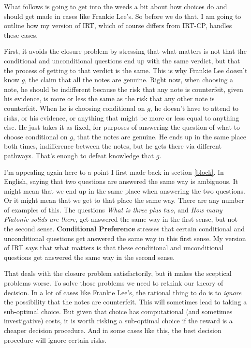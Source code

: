 \documentclass[11pt,]{book}
\begin{document}
What follows is going to get into the weeds a bit about how choices do and should get made in cases like Frankie Lee's. So before we do that, I am going to outline how my version of IRT, which of course differs from IRT-CP, handles these cases.

First, it avoids the closure problem by stressing that what matters is not that the conditional and unconditional questions end up with the same verdict, but that the process of getting to that verdict is the same. This is why Frankie Lee doesn't know \(g\), the claim that all the notes are genuine. Right now, when choosing a note, he should be indifferent because the risk that any note is counterfeit, given his evidence, is more or less the same as the risk that any other note is counterfeit. When he is choosing conditional on \(g\), he doesn't have to attend to risks, or his evidence, or anything that might be more or less equal to anything else. He just takes it as fixed, for purposes of answering the question of what to choose conditional on \(g\), that the notes are genuine. He ends up in the same place both times, indifference between the notes, but he gets there via different pathways. That's enough to defeat knowledge that \(g\).

I'm appealing again here to a point I first made back in section \ref{block}. In English, saying that two questions are answered the same way is ambiguous. It might mean that we end up in the same place when answering the two questions. Or it might mean that we get to that place the same way. There are any number of examples of this. The questions \emph{What is three plus two}, and \emph{How many Platonic solids are there}, get answered the same way in the first sense, but not the second sense. \textbf{Conditional Preference} stresses that certain conditional and unconditional questions get answered the same way in this first sense. My version of IRT says that what matters is that these conditional and unconditional questions get answered the same way in the second sense.

That deals with the closure problem satisfactorily, but it makes the sceptical problems worse. To solve those problems we need to rethink our theory of decision. In a lot of cases like Frankie Lee's, the rational thing to do is to \emph{ignore} the possibility that the notes are counterfeit. This will sometimes lead to taking a sub-optimal choice. But given that choice has computational (and sometimes investigative) costs, it is worth risking a sub-optimal choice if the reward is a cheaper decision procedure. And in some cases like this, the best decision procedure will ignore certain risks.
\end{document}
